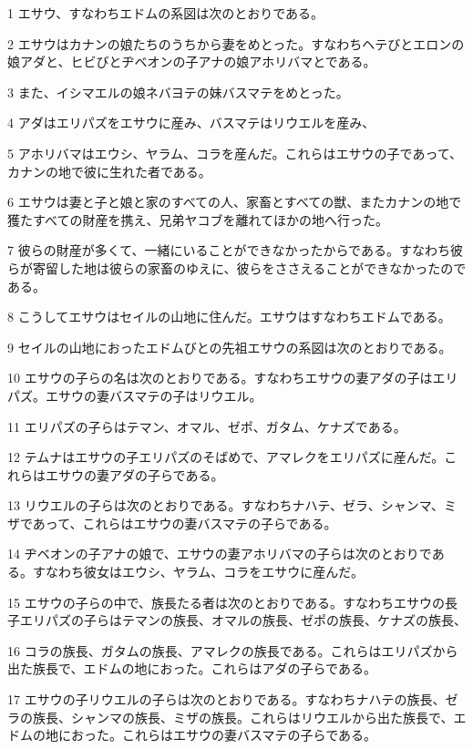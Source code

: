 \par 1 エサウ、すなわちエドムの系図は次のとおりである。
\par 2 エサウはカナンの娘たちのうちから妻をめとった。すなわちヘテびとエロンの娘アダと、ヒビびとヂベオンの子アナの娘アホリバマとである。
\par 3 また、イシマエルの娘ネバヨテの妹バスマテをめとった。
\par 4 アダはエリパズをエサウに産み、バスマテはリウエルを産み、
\par 5 アホリバマはエウシ、ヤラム、コラを産んだ。これらはエサウの子であって、カナンの地で彼に生れた者である。
\par 6 エサウは妻と子と娘と家のすべての人、家畜とすべての獣、またカナンの地で獲たすべての財産を携え、兄弟ヤコブを離れてほかの地へ行った。
\par 7 彼らの財産が多くて、一緒にいることができなかったからである。すなわち彼らが寄留した地は彼らの家畜のゆえに、彼らをささえることができなかったのである。
\par 8 こうしてエサウはセイルの山地に住んだ。エサウはすなわちエドムである。
\par 9 セイルの山地におったエドムびとの先祖エサウの系図は次のとおりである。
\par 10 エサウの子らの名は次のとおりである。すなわちエサウの妻アダの子はエリパズ。エサウの妻バスマテの子はリウエル。
\par 11 エリパズの子らはテマン、オマル、ゼポ、ガタム、ケナズである。
\par 12 テムナはエサウの子エリパズのそばめで、アマレクをエリパズに産んだ。これらはエサウの妻アダの子らである。
\par 13 リウエルの子らは次のとおりである。すなわちナハテ、ゼラ、シャンマ、ミザであって、これらはエサウの妻バスマテの子らである。
\par 14 ヂベオンの子アナの娘で、エサウの妻アホリバマの子らは次のとおりである。すなわち彼女はエウシ、ヤラム、コラをエサウに産んだ。
\par 15 エサウの子らの中で、族長たる者は次のとおりである。すなわちエサウの長子エリパズの子らはテマンの族長、オマルの族長、ゼポの族長、ケナズの族長、
\par 16 コラの族長、ガタムの族長、アマレクの族長である。これらはエリパズから出た族長で、エドムの地におった。これらはアダの子らである。
\par 17 エサウの子リウエルの子らは次のとおりである。すなわちナハテの族長、ゼラの族長、シャンマの族長、ミザの族長。これらはリウエルから出た族長で、エドムの地におった。これらはエサウの妻バスマテの子らである。
